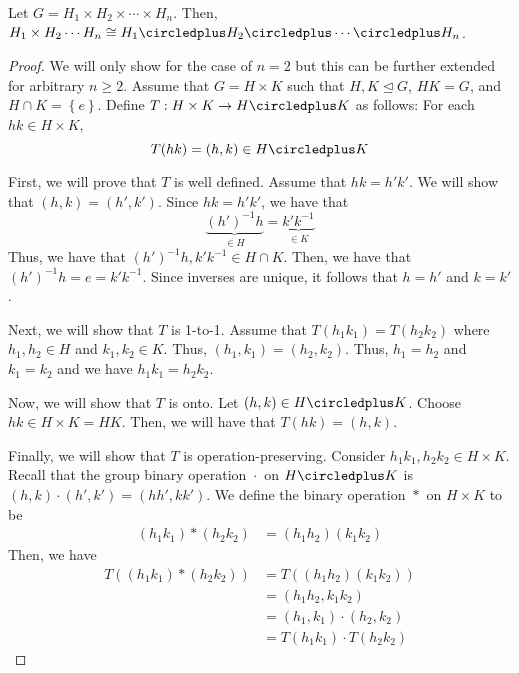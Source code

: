 \begin{theorem}
    Let \(G = H_1 \times H_2 \times \cdots \times H_n\). Then, \(H_1 \times H_2 \cdots H_n \cong H_1 \circledplus H_2 \circledplus \cdots \circledplus H_n\).
\end{theorem}

\begin{proof}
    We will only show for the case of \(n=2\) but this can be further extended for arbitrary \(n \geq 2\). Assume that \(G = H \times K\) such that \(H, K \unlhd G\), \(HK = G\), and \(H \cap K = \left\{e\right\}\). Define \(T : H \times K \to H \circledplus K\) as follows: For each \(hk \in H \times K\),
    \[
        T(hk) = (h, k) \in H \circledplus K
    \]

    First, we will prove that \(T\) is well defined. Assume that \(hk = h'k'\). We will show that \((h, k) = (h', k')\). Since \(hk = h'k'\), we have that
    \[
        \underbrace{(h')^{-1}h}_{\in H} = \underbrace{k'k^{-1}}_{\in K}
    \]
    Thus, we have that \((h')^{-1}h, k'k^{-1} \in H \cap K\). Then, we have that \((h')^{-1}h = e = k'k^{-1}\). Since inverses are unique, it follows that \(h=h'\) and \(k=k'\).

    Next, we will show that \(T\) is 1-to-1. Assume that \(T(h_1 k_1) = T(h_2 k_2)\) where \(h_1, h_2 \in H\) and \(k_1, k_2 \in K\). Thus, \((h_1, k_1) = (h_2, k_2)\). Thus, \(h_1 = h_2\) and \(k_1 = k_2\) and we have \(h_1 k_1 = h_2 k_2\).

    Now, we will show that \(T\) is onto. Let \((h, k) \in H \circledplus K\). Choose \(hk \in H \times K = HK\). Then, we will have that \(T(hk) = (h, k)\).

    Finally, we will show that \(T\) is operation-preserving. Consider \(h_1 k_1, h_2 k_2 \in H \times K\). Recall that the group binary operation \({}\cdot{}\) on \(H \circledplus K\) is \((h, k) \cdot (h', k') = (hh', kk')\). We define the binary operation \({}*{}\) on \(H \times K\) to be
    \[
    \begin{aligned}
        (h_1 k_1) * (h_2 k_2) &= (h_1 h_2) (k_1 k_2)
    \end{aligned}
    \]
    Then, we have
    \[
    \begin{aligned}
        T((h_1 k_1) * (h_2 k_2)) &= T((h_1 h_2)(k_1 k_2)) \\
                                 &= (h_1 h_2, k_1 k_2) \\
                                 &= (h_1, k_1) \cdot (h_2, k_2) \\
                                 &= T(h_1 k_1) \cdot T(h_2 k_2)
    \end{aligned}
    \]
\end{proof}

